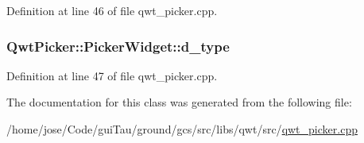 Definition at line 46 of file qwt\-\_\-picker.\-cpp.

\hypertarget{class_qwt_picker_1_1_picker_widget_adda5f381a70797346478dcdebcd64009}{
\subsubsection[{d\-\_\-type}]{ Qwt\-Picker\-::\-Picker\-Widget\-::d\-\_\-type\hspace{0.3cm}{\ttfamily [protected]}}}\label{class_qwt_picker_1_1_picker_widget_adda5f381a70797346478dcdebcd64009}


Definition at line 47 of file qwt\-\_\-picker.\-cpp.



The documentation for this class was generated from the following file\-:\begin{DoxyCompactItemize}
\item 
/home/jose/\-Code/gui\-Tau/ground/gcs/src/libs/qwt/src/\hyperlink{qwt__picker_8cpp}{qwt\-\_\-picker.\-cpp}\end{DoxyCompactItemize}
